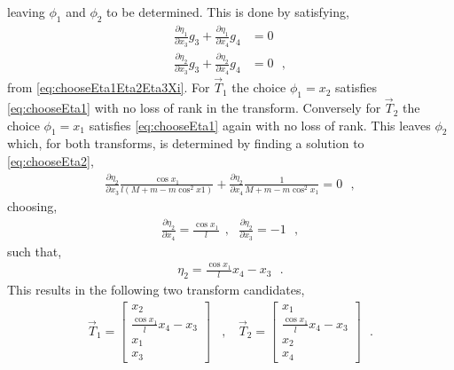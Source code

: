 leaving $\phi_1$ and $\phi_2$ to be determined. This is done by satisfying,
\begin{align}
  \frac{\partial \eta_1}{\partial x_3} g_3 + \frac{\partial \eta_1}{\partial x_4} g_4 &= 0       \label{eq:chooseEta1}  \\
  \frac{\partial \eta_2}{\partial x_3} g_3 + \frac{\partial \eta_2}{\partial x_4} g_4 &= 0       \label{eq:chooseEta2}  
  \ \ \ ,
\end{align}
from \autoref{eq:chooseEta1Eta2Eta3Xi}. For $\vec{T}_1$ the choice $\phi_1 = x_2$ satisfies \autoref{eq:chooseEta1} with no loss of rank in the transform. Conversely for $\vec{T}_2$ the choice $\phi_1 = x_1$ satisfies \autoref{eq:chooseEta1} again with no loss of rank. This leaves $\phi_2$ which, for both transforms, is determined by finding a solution to \autoref{eq:chooseEta2},
\begin{align}
  \frac{\partial \eta_2}{\partial x_3} \frac{\cos x_1}{l (M + m - m \cos^2 x1)} + \frac{\partial \eta_2}{\partial x_4} \frac{1}{M + m - m \cos^2 x_1 } = 0 \ \ \ ,
\end{align}
choosing,
\begin{align}
  \frac{\partial \eta_2}{\partial x_4} = \frac{\cos x_1}{l}  \ \ , \ \ \ \frac{\partial \eta_2}{\partial x_3}  = -1 \ \ \ ,
\end{align}
such that,
\begin{align}
  \eta_2 =  \frac{\cos x_1}{l} x_4 - x_3 \ \ \ .
\end{align}
%
This results in the following two transform candidates,
\begin{align}
  \vec{T}_1 =
  \begin{bmatrix}
    x_2   \\
    \frac{\cos x_1}{l} x_4 - x_3  \\
    x_1   \\
    x_3
  \end{bmatrix} \ \ \ \ , \ \ \ \
  \vec{T}_2
  =
  \begin{bmatrix}
    x_1   \\
    \frac{\cos x_1}{l} x_4 - x_3   \\
    x_2   \\
    x_4
  \end{bmatrix} \ \ \ .
\end{align}
